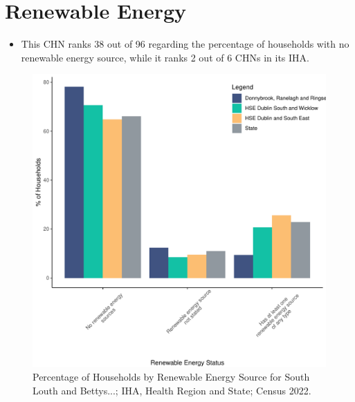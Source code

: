 \documentclass{article}
\begin{document}
\section{Renewable Energy}\label{sect:RE}
\begin{itemize}
\item This CHN ranks  38 out of 96 regarding the percentage of households with no renewable energy source, while it ranks   2 out of 6 CHNs in its IHA.
\end{itemize}
\begin{figure}[H]
	\centering
	\includegraphics[width = 140mm]{../figures/RenewableEnergyED.pdf}
	\caption{Percentage of Households by Renewable Energy Source for South Louth and Bettys...; IHA, Health Region and State; Census 2022.}
	\label{fig:vbnv}
	\end{figure}
\end{document}
